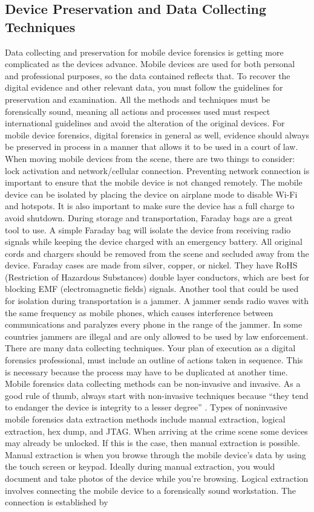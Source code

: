 \documentclass[acmlarge]{acmart}
\begin{document}
\subsection{Device Preservation and Data Collecting Techniques}
Data collecting and preservation for mobile device forensics is getting more complicated as the devices advance.  Mobile devices are used for both personal and professional purposes, so the data contained reflects that.  To recover the digital evidence and other relevant data, you must follow the guidelines for preservation and examination.  All the methods and techniques must be forensically sound, meaning all actions and processes used must respect international guidelines and avoid the alteration of the original devices.  For mobile device forensics, digital forensics in general as well, evidence should always be preserved in process in a manner that allows it to be used in a court of law.  When moving mobile devices from the scene, there are two things to consider: lock activation and network/cellular connection.  Preventing network connection is important to ensure that the mobile device is not changed remotely.  The mobile device can be isolated by placing the device on airplane mode to disable Wi-Fi and hotspots.  It is also important to make sure the device has a full charge to avoid shutdown.  During storage and transportation, Faraday bags are a great tool to use.  A simple Faraday bag will isolate the device from receiving radio signals while keeping the device charged with an emergency battery.  All original cords and chargers should be removed from the scene and secluded away from the device.  Faraday cases are made from silver, copper, or nickel.  They have RoHS (Restriction of Hazardous Substances) double layer conductors, which are best for blocking EMF (electromagnetic fields) signals.  Another tool that could be used for isolation during transportation is a jammer.  A jammer sends radio waves with the same frequency as mobile phones, which causes interference between communications and paralyzes every phone in the range of the jammer.  In some countries jammers are illegal and are only allowed to be used by law enforcement.  There are many data collecting techniques.  Your plan of execution as a digital forensics professional, must include an outline of actions taken in sequence.  This is necessary because the process may have to be duplicated at another time.  Mobile forensics data collecting methods can be non-invasive and invasive.  As a good rule of thumb, always start with non-invasive techniques because “they tend to endanger the device is integrity to a lesser degree” \cite{Kostadinov_2019}.  Types of noninvasive mobile forensics data extraction methods include manual extraction, logical extraction, hex dump, and JTAG.  When arriving at the crime scene some devices may already be unlocked.  If this is the case, then manual extraction is possible.  Manual extraction is when you browse through the mobile device’s data by using the touch screen or keypad.  Ideally during manual extraction, you would document and take photos of the device while you're browsing.  Logical extraction involves connecting the mobile device to a forensically sound workstation.  The connection is established by 
\end{document}

